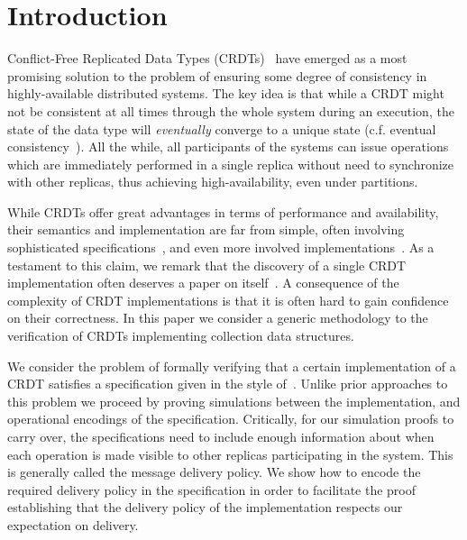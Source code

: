 \section{Introduction}
\label{sec:introduction}

Conflict-Free Replicated Data Types (CRDTs)~\cite{Shapiro:2011} have
emerged as a most promising solution to the problem of ensuring
some degree of consistency in highly-available distributed systems.
%
The key idea is that while a CRDT might not be consistent at all times
through the whole system during an execution, the state of the
data type will \emph{eventually} converge to a unique state (c.f.
eventual consistency~\cite{Burckhardt:2014b}).
%
All the while, all participants of the systems can issue operations
which are immediately performed in a single replica without need to
synchronize with other replicas, thus achieving high-availability,
even under partitions.

While CRDTs offer great advantages in terms of performance and
availability, their semantics and implementation are far from simple,
often involving sophisticated specifications~\cite{Burckhardt:2014b}, and
even more involved implementations~\cite{Shapiro:2011}.
%
As a testament to this claim, we remark that the discovery of a single
CRDT implementation often deserves a paper on itself~\cite{RohJKL11,KleppmannB17}.
%
A consequence of the complexity of CRDT implementations is that it is
often hard to gain confidence on their correctness.
%
In this paper we consider a generic methodology to the verification of
CRDTs implementing collection data structures.

We consider the problem of formally verifying that a certain
implementation of a CRDT satisfies a specification given in the
style of~\cite{Burckhardt:2014}.
%
Unlike prior approaches to this problem we proceed by
proving simulations between the implementation, and operational
encodings of the specification.
%
Critically, for our simulation proofs to carry over, the
specifications need to include enough information about when each
operation is made visible to other replicas participating in the
system.
%
This is generally called the message delivery policy.
%
We show how to encode the required delivery policy in the
specification in order to facilitate the proof establishing that the
delivery policy of the implementation respects our expectation on
delivery. 


